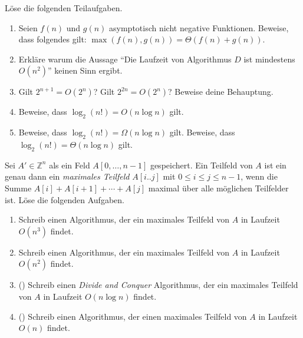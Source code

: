 \documentclass{uebung_cs}
\begin{document}
\begin{aufgabe}
	Löse die folgenden Teilaufgaben.
	\begin{enumerate}
		\item \bestehen Seien $f(n)$ und $g(n)$ asymptotisch nicht negative Funktionen.
		Beweise, dass folgendes gilt: $\max(f(n),g(n)) = \Theta(f(n) + g(n))$.
		\item \bestehen Erkläre warum die Aussage \enquote{Die Laufzeit von Algorithmus $D$ ist mindestens $O(n^2)$} keinen Sinn ergibt.
		\item \bestehen Gilt $2^{n+1} = O(2^n)$? Gilt $2^{2n} = O(2^n)$? Beweise deine Behauptung.
		\item \bestehen Beweise, dass $\log_2(n!) = O(n \log n)$ gilt.
		\item \note %
    Beweise, dass $\log_2(n!) = \Omega(n\log n)$ gilt.
		Beweise, dass $\log_2(n!) = \Theta(n\log n)$ gilt.
	\end{enumerate}
\end{aufgabe}

\begin{aufgabe}
	Sei $A' \in \mathbb{Z}^n$ als ein Feld $A[0, \dots, n-1]$ gespeichert.
	Ein Teilfeld von $A$ ist ein genau dann ein \textit{maximales Teilfeld} $A[i..j]$ mit $0\leq i\leq j\leq n-1$, wenn die Summe $A[i] + A[i+1] + \cdots + A[j]$ maximal über alle möglichen Teilfelder ist.
	Löse die folgenden Aufgaben.
	\begin{enumerate}
		\item \bestehen %
    Schreib einen Algorithmus, der ein maximales Teilfeld von $A$ in Laufzeit $O(n^3)$ findet.
		\item \bestehen Schreib einen Algorithmus, der ein maximales Teilfeld von $A$ in Laufzeit $O(n^2)$ findet.
		\item \mittel (\hard) Schreib einen \textit{Divide and Conquer} Algorithmus, der ein maximales Teilfeld von $A$ in Laufzeit $O(n\log n)$ findet.
		\item \mittel (\veryhard) Schreib einen Algorithmus, der einen maximales Teilfeld von $A$ in Laufzeit $O(n)$ findet.
	\end{enumerate}
\end{aufgabe}
\end{document}
